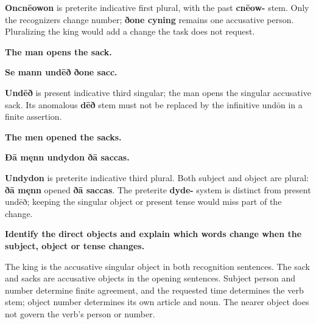 \textbf{Oncnēowon} is preterite indicative first plural, with the past \textbf{cnēow-} stem. Only the recognizers change number; \textbf{ðone cyning} remains one accusative person. Pluralizing the king would add a change the task does not request.

\par\begin{minipage}{\linewidth}\raggedright
\textbf{The man opens the sack.}

\textbf{Se mann undēð ðone sacc.}
\end{minipage}\par

\textbf{Undēð} is present indicative third singular; the man opens the singular accusative sack. Its anomalous \textbf{dēð} stem must not be replaced by the infinitive undōn in a finite assertion.

\par\begin{minipage}{\linewidth}\raggedright
\textbf{The men opened the sacks.}

\textbf{Ðā męnn undydon ðā saccas.}
\end{minipage}\par

\textbf{Undydon} is preterite indicative third plural. Both subject and object are plural: \textbf{ðā męnn} opened \textbf{ðā saccas}. The preterite \textbf{dyde-} system is distinct from present undēð; keeping the singular object or present tense would miss part of the change.

\textbf{Identify the direct objects and explain which words change when the subject, object or tense changes.}

The king is the accusative singular object in both recognition sentences. The sack and sacks are accusative objects in the opening sentences. Subject person and number determine finite agreement, and the requested time determines the verb stem; object number determines its own article and noun. The nearer object does not govern the verb’s person or number.

